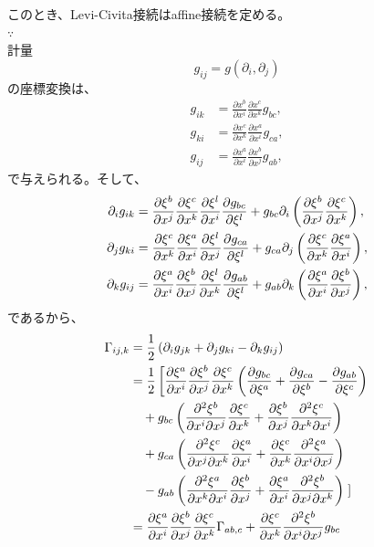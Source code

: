 \documentclass[a4paper,11pt]{jsarticle}
\numberwithin{equation}{section}
\begin{document}
このとき、Levi-Civita接続はaffine接続を定める。\\
$\because$\\
計量
\begin{equation}
    g_{ij} = g(\partial_i,\partial_j)
\end{equation}
の座標変換は、
\[
\begin{aligned}
g_{ik} &= \frac{\partial x^b}{\partial x^i} \frac{\partial x^c}{\partial x^k} g_{bc}, \\
g_{ki} &= \frac{\partial x^c}{\partial x^k} \frac{\partial x^a}{\partial x^i} g_{ca}, \\
g_{ij} &= \frac{\partial x^a}{\partial x^i} \frac{\partial x^b}{\partial x^j} g_{ab},
\end{aligned}
\]
で与えられる。そして、
\begin{align}
\begin{aligned}
\partial_i g_{ik} &= \pdv{\xi^b}{x^j} \pdv{\xi^c}{x^k} \pdv{\xi^l}{x^i} \pdv{g_{bc}}{\xi^l} + g_{bc} \partial_i \left( \pdv{\xi^b}{x^j} \pdv{\xi^c}{x^k} \right), \\
\partial_j g_{ki} &= \pdv{\xi^c}{x^k} \pdv{\xi^a}{x^i} \pdv{\xi^l}{x^j} \pdv{g_{ca}}{\xi^l} + g_{ca} \partial_j \left( \pdv{\xi^c}{x^k} \pdv{\xi^a}{x^i} \right), \\
\partial_k g_{ij} &= \pdv{\xi^a}{x^i} \pdv{\xi^b}{x^j} \pdv{\xi^l}{x^k} \pdv{g_{ab}}{\xi^l} + g_{ab} \partial_k \left( \pdv{\xi^a}{x^i} \pdv{\xi^b}{x^j} \right),
\end{aligned}
\end{align}
であるから、
\begin{align}
    \Gamma_{ij,k} &= \frac{1}{2} \left( \partial_i g_{jk} + \partial_j g_{ki} - \partial_k g_{ij} \right) \\
    &= \frac{1}{2} \left[ \pdv{\xi^a}{x^i} \pdv{\xi^b}{x^j} \pdv{\xi^c}{x^k} \left( \pdv{g_{bc}}{\xi^a} + \pdv{g_{ca}}{\xi^b} - \pdv{g_{ab}}{\xi^c} \right) \right. \\
    &\quad + g_{bc} \left( \pdv[2]{\xi^b}{x^i}{x^j} \pdv{\xi^c}{x^k} + \pdv{\xi^b}{x^j} \pdv[2]{\xi^c}{x^k}{x^i} \right) \\
    &\quad + g_{ca} \left( \pdv[2]{\xi^c}{x^j}{x^k} \pdv{\xi^a}{x^i} + \pdv{\xi^c}{x^k} \pdv[2]{\xi^a}{x^i}{x^j} \right) \\
    &\quad - g_{ab} \left( \pdv[2]{\xi^a}{x^k}{x^i} \pdv{\xi^b}{x^j} + \pdv{\xi^a}{x^i} \pdv[2]{\xi^b}{x^j}{x^k} \right) \left. \right] \\
    &= \pdv{\xi^a}{x^i} \pdv{\xi^b}{x^j} \pdv{\xi^c}{x^k} \Gamma_{ab,c} + \pdv{\xi^c}{x^k} \pdv[2]{\xi^b}{x^i}{x^j} g_{bc}
\end{align}
\end{document}
